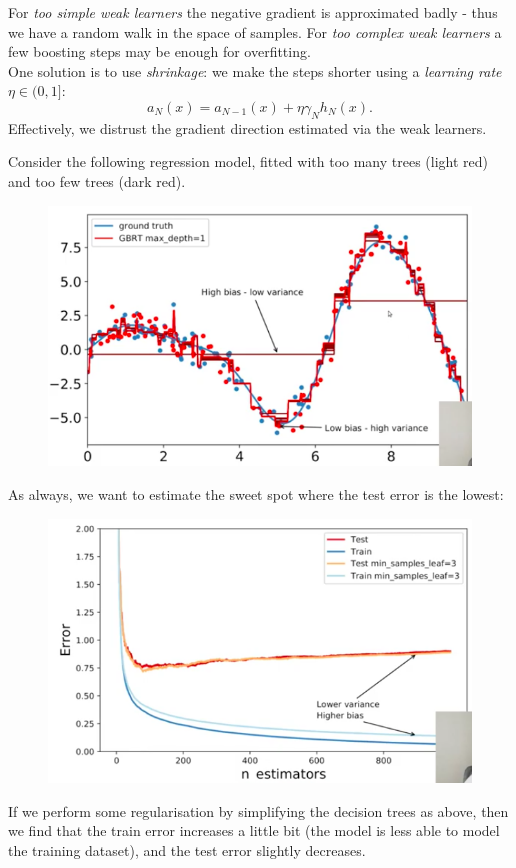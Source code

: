 For \textit{too simple weak learners} the negative gradient is approximated badly - thus we have a random walk in the space of samples. For \textit{too complex weak learners} a few boosting steps may be enough for overfitting.\\

One solution is to use \textit{shrinkage}: we make the steps shorter using a \textit{learning rate} $\eta \in (0,1]$:
\begin{equation*}
a_N(x) = a_{N-1}(x) + \eta \gamma_N h_N(x).
\end{equation*}
Effectively, we distrust the gradient direction estimated via the weak learners.

\begin{frameex}
Consider the following regression model, fitted with too many trees (light red) and too few trees (dark red).
\begin{figure}[H]
\centering
\includegraphics[scale=0.4]{overfittree.png}
\end{figure}
As always, we want to estimate the sweet spot where the test error is the lowest:
\begin{figure}[H]
\centering
\includegraphics[scale=0.4]{testtraintree.png}
\end{figure}
If we perform some regularisation by simplifying the decision trees as above, then we find that the train error increases a little bit (the model is less able to model the training dataset), and the test error slightly decreases.




\end{frameex}
